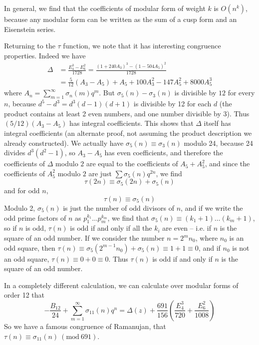 In general, we find that the coefficients of modular form of weight $k$ is $O(n^k)$, because any modular form can be written as the sum of a cusp form and an Eisenstein series.

Returning to the $\tau$ function, we note that it has interesting congruence properties. Indeed we have
%
\begin{align*}
    \Delta &= \frac{E_4^3 - E_6^2}{1728} = \frac{\left( 1 + 240 A_3 \right)^3 - \left( 1 - 504 A_5 \right)^2}{1728}\\
    &= \frac{5}{12} (A_3 - A_5) + A_5 + 100A_3^2 - 147A_5^2 + 8000A_5^3
\end{align*}
%
where $A_n = \sum_{m = 1}^\infty \sigma_n(m) q^m$. But $\sigma_5(n) - \sigma_3(n)$ is divisible by $12$ for every $n$, because $d^5 - d^3 = d^3(d - 1)(d + 1)$ is divisible by 12 for each $d$ (the product contains at least 2 even numbers, and one number divisible by 3). Thus $(5/12) (A_3 - A_5)$ has integral coefficients. This shows that $\Delta$ itself has integral coefficients (an alternate proof, not assuming the product description we already constructed). We actually have $\sigma_5(n) \equiv \sigma_3(n)$ modulo 24, because 24 divides $d^3(d^2 - 1)$, so $A_3 - A_5$ has even coefficients, and therefore the coefficients of $\Delta$ modulo $2$ are equal to the coefficients of $A_5 + A_5^2$, and since the coefficients of $A_5^2$ modulo $2$ are just $\sum \sigma_5(n) q^{2n}$, we find
%
\[ \tau(2n) \equiv \sigma_5(2n) + \sigma_5(n) \]
%
and for odd $n$,
%
\[ \tau(n) \equiv \sigma_5(n) \]
%
Modulo 2, $\sigma_5(n)$ is just the number of odd divisors of $n$, and if we write the odd prime factors of $n$ as $p_1^{k_1} \dots p_m^{k_m}$, we find that $\sigma_5(n) \equiv (k_1 + 1) \dots (k_m + 1)$, so if $n$ is odd, $\tau(n)$ is odd if and only if all the $k_i$ are even -- i.e. if $n$ is the square of an odd number. If we consider the number $n = 2^m n_0$, where $n_0$ is an odd square, then $\tau(n) \equiv \sigma_5(2^{m-1}n_0) + \sigma_5(n) \equiv 1 + 1 \equiv 0$, and if $n_0$ is not an odd square, $\tau(n) \equiv 0 + 0 \equiv 0$. Thus $\tau(n)$ is odd if and only if $n$ is the square of an odd number.

In a completely different calculation, we can calculate over modular forms of order 12 that
%
\[ - \frac{B_{12}}{24} + \sum_{m = 1}^\infty \sigma_{11}(n) q^n = \Delta(z) + \frac{691}{156} \left( \frac{E_4^3}{720} + \frac{E_6^2}{1008} \right) \]
%
So we have a famous congruence of Ramanujan, that $\tau(n) \equiv \sigma_{11}(n)\ (\text{mod}\ 691)$.

